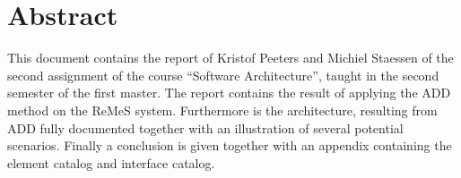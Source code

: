 \chapter{Abstract}

\npar This document contains the report of Kristof Peeters and Michiel Staessen
of the second assignment of the course ``Software Architecture'', taught in the
second semester of the first master. The report contains the result of applying
the ADD method on the ReMeS system. Furthermore is the architecture, resulting
from ADD fully documented together with an illustration of several potential
scenarios. Finally a conclusion is given together with an appendix containing
the element catalog and interface catalog.